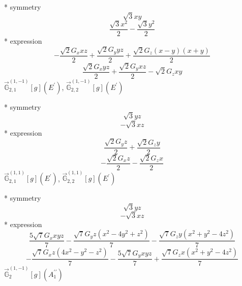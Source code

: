 \documentclass[fleqn,8pt]{jsarticle}
\begin{document}
\noindent\quad ** symmetry
\begin{dmath*}
\sqrt{3} x y
\end{dmath*}
\begin{dmath*}
\frac{\sqrt{3} x^{2}}{2} - \frac{\sqrt{3} y^{2}}{2}
\end{dmath*}
\noindent\quad ** expression
\begin{dmath*}
- \frac{\sqrt{2} G_{x} x z}{2} + \frac{\sqrt{2} G_{y} y z}{2} + \frac{\sqrt{2} G_{z} \left(x - y\right) \left(x + y\right)}{2}
\end{dmath*}
\begin{dmath*}
\frac{\sqrt{2} G_{x} y z}{2} + \frac{\sqrt{2} G_{y} x z}{2} - \sqrt{2} G_{z} x y
\end{dmath*}
\noindent\quad $\vec{\mathbb{G}}_{2,1}^{(1,-1)}[g](E^{\prime})$, $\vec{\mathbb{G}}_{2,2}^{(1,-1)}[g](E^{\prime})$

\noindent\quad ** symmetry
\begin{dmath*}
\sqrt{3} y z
\end{dmath*}
\begin{dmath*}
- \sqrt{3} x z
\end{dmath*}
\noindent\quad ** expression
\begin{dmath*}
\frac{\sqrt{2} G_{y} z}{2} + \frac{\sqrt{2} G_{z} y}{2}
\end{dmath*}
\begin{dmath*}
- \frac{\sqrt{2} G_{x} z}{2} - \frac{\sqrt{2} G_{z} x}{2}
\end{dmath*}
\noindent\quad $\vec{\mathbb{G}}_{2,1}^{(1,1)}[g](E^{\prime})$, $\vec{\mathbb{G}}_{2,2}^{(1,1)}[g](E^{\prime})$

\noindent\quad ** symmetry
\begin{dmath*}
\sqrt{3} y z
\end{dmath*}
\begin{dmath*}
- \sqrt{3} x z
\end{dmath*}
\noindent\quad ** expression
\begin{dmath*}
\frac{5 \sqrt{7} G_{x} x y z}{7} - \frac{\sqrt{7} G_{y} z \left(x^{2} - 4 y^{2} + z^{2}\right)}{7} - \frac{\sqrt{7} G_{z} y \left(x^{2} + y^{2} - 4 z^{2}\right)}{7}
\end{dmath*}
\begin{dmath*}
- \frac{\sqrt{7} G_{x} z \left(4 x^{2} - y^{2} - z^{2}\right)}{7} - \frac{5 \sqrt{7} G_{y} x y z}{7} + \frac{\sqrt{7} G_{z} x \left(x^{2} + y^{2} - 4 z^{2}\right)}{7}
\end{dmath*}
\noindent\quad $\vec{\mathbb{G}}_{2}^{(1,-1)}[g](A_{1}^{\prime\prime})$
\end{document}
